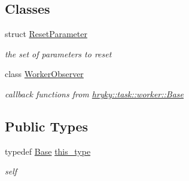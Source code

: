 \subsection*{Classes}
\begin{DoxyCompactItemize}
\item 
struct \hyperlink{structhryky_1_1task_1_1distributor_1_1_base_1_1_reset_parameter}{Reset\-Parameter}
\begin{DoxyCompactList}\small\item\em the set of parameters to reset \end{DoxyCompactList}\item 
class \hyperlink{classhryky_1_1task_1_1distributor_1_1_base_1_1_worker_observer}{Worker\-Observer}
\begin{DoxyCompactList}\small\item\em callback functions from \hyperlink{classhryky_1_1task_1_1worker_1_1_base}{hryky\-::task\-::worker\-::\-Base} \end{DoxyCompactList}\end{DoxyCompactItemize}
\subsection*{Public Types}
\begin{DoxyCompactItemize}
\item 
\hypertarget{classhryky_1_1task_1_1distributor_1_1_base_a5c531dbd3d9dcc53402447d8300de184}{typedef \hyperlink{classhryky_1_1task_1_1distributor_1_1_base}{Base} \hyperlink{classhryky_1_1task_1_1distributor_1_1_base_a5c531dbd3d9dcc53402447d8300de184}{this\-\_\-type}}\label{classhryky_1_1task_1_1distributor_1_1_base_a5c531dbd3d9dcc53402447d8300de184}

\begin{DoxyCompactList}\small\item\em self \end{DoxyCompactList}\end{DoxyCompactItemize}
